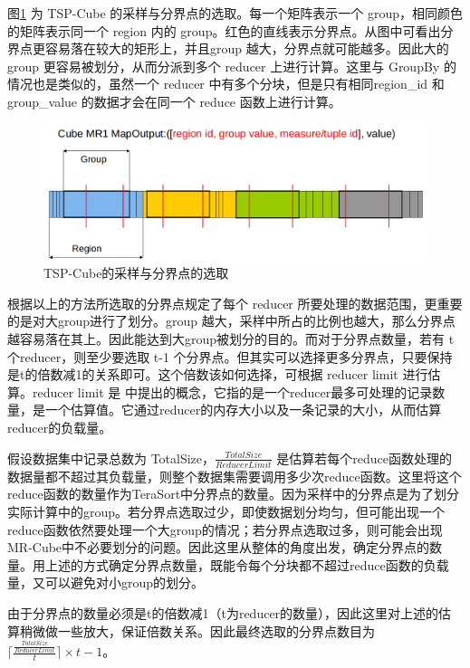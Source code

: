 图\ref{tscube_picture} 为 TSP-Cube 的采样与分界点的选取。每一个矩阵表示一个 group，相同颜色的矩阵表示同一个 region 内的 group。红色的直线表示分界点。从图中可看出分界点更容易落在较大的矩形上，并且group 越大，分界点就可能越多。因此大的 group 更容易被划分，从而分派到多个 reducer 上进行计算。这里与 GroupBy 的情况也是类似的，虽然一个 reducer 中有多个分块，但是只有相同region\_id 和 group\_value 的数据才会在同一个 reduce 函数上进行计算。

\begin{figure}[!htb] 
\centering\includegraphics[width=6in]{picture/ch_terasort_mr/tscube_picture} 
\caption{TSP-Cube的采样与分界点的选取}\label{tscube_picture} 
\end{figure}

根据以上的方法所选取的分界点规定了每个 reducer 所要处理的数据范围，更重要的是对大group进行了划分。group 越大，采样中所占的比例也越大，那么分界点越容易落在其上。因此能达到大group被划分的目的。而对于分界点数量，若有 t 个reducer，则至少要选取 t-1 个分界点。但其实可以选择更多分界点，只要保持是t的倍数减1的关系即可。这个倍数该如何选择，可根据 reducer limit 进行估算。reducer limit 是 \cite{nandi2011distributed} 中提出的概念，它指的是一个reducer最多可处理的记录数量，是一个估算值。它通过reducer的内存大小以及一条记录的大小，从而估算reducer的负载量。

假设数据集中记录总数为 TotalSize，$\frac{TotalSize}{ReducerLimit}$ 是估算若每个reduce函数处理的数据量都不超过其负载量，则整个数据集需要调用多少次reduce函数。这里将这个reduce函数的数量作为TeraSort中分界点的数量。因为采样中的分界点是为了划分实际计算中的group。若分界点选取过少，即使数据划分均匀，但可能出现一个reduce函数依然要处理一个大group的情况；若分界点选取过多，则可能会出现MR-Cube中不必要划分的问题。因此这里从整体的角度出发，确定分界点的数量。用上述的方式确定分界点数量，既能令每个分块都不超过reduce函数的负载量，又可以避免对小group的划分。

由于分界点的数量必须是t的倍数减1（t为reducer的数量），因此这里对上述的估算稍微做一些放大，保证倍数关系。因此最终选取的分界点数目为$\lceil \frac{\frac{TotalSize}{ReducerLimit}}{t} \rceil \times t -1 $。

